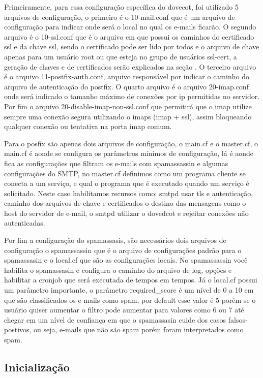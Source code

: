 Primeiramente, para essa configuração específica do dovecot, foi utilizado 5 arquivos
de configuração, o primeiro é o 10-mail.conf que é um arquivo de configuração para
indicar onde será o local no qual os e-mails ficarão. O segundo arquivo é o 10-ssl.conf
que é o arquivo em que possui os caminhos do certificado ssl e da chave ssl, sendo o
certificado pode ser lido por todos e o arquivo de chave apenas para um usuário root
ou que esteja no grupo de usuários ssl-cert, a geração de chaves e de certificados serão
explicados na seção %
. O terceiro arquivo é o arquivo
11-postfix-auth.conf, arquivo responsável por indicar o caminho do arquivo de autenticação
do postfix. O quarto arquivo é o arquivo 20-imap.conf onde será indicado o tamanho
máximo de conexões por ip permitidas no servidor. Por fim o arquivo
20-disable-imap-non-ssl.conf que permitirá que o imap utilize sempre uma conexão
segura utilizando o imaps (imap + ssl), assim bloqueando qualquer conexão ou
tentativa na porta imap comum.

Para o posfix são apenas dois arquivos de configuração, o main.cf e o master.cf,
o main.cf é aonde se configura os parâmetros mínimos de configuração, lá é aonde fica as configurações que filtram os e-mails com spamassassin e algumas configurações do SMTP, no
master.cf definimos como um programa cliente se conecta a um serviço, e qual o
programa que é executado quando um serviço é solicitado. Neste caso habilitamos
recursos como: smtpd usar tls e autenticação, caminho dos arquivos de chave e certificados
o destino das mensagens como o host do servidor de e-mail, o smtpd utilizar o dovedcot
e rejeitar conexões não autenticadas.

Por fim a configuração do spamassasis, são necessários dois arquivos de configuração
o spamassassin que é o arquivo de configurações padrão para o spamassasin e o
local.cf que são as configurações locais. No spamassassin você habilita o spamassasin
e configura o caminho do arquivo de log, opções e habilitar a cronjob que será
executada de tempos em tempos. Já o local.cf possui um parâmetro importante, o
parâmetro required\_score é um nível de 0 a 10 em que são classificados os e-mails
como spam, por default esse valor é 5 porém se o usuário quiser aumentar o filtro
pode aumentar para valores como 6 ou 7 até chegar em um nível de confiança em que
o spamassasin cuide dos casos falsos-postivos, ou seja, e-mails que não são spam
porém foram interpretados como spam.

\subsection{Inicialização}

